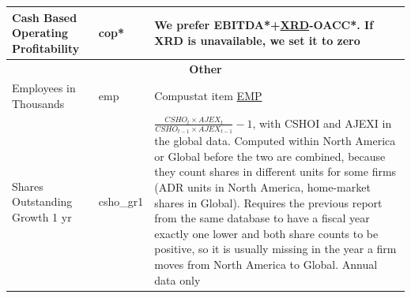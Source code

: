 \documentclass[12pt,title,fleqn]{article}
\begin{document}
{\begin{longtable}{@{\extracolsep{\fill}}|m{5cm}|l|m{8cm}|@{}}
	Cash Based Operating Profitability & cop\mbox{*} & We prefer EBITDA\mbox{*}+\href{https://wrds-www.wharton.upenn.edu/data-dictionary/form_metadata/comp_na_daily_all_funda_incomestatementitems/XRD/}{XRD}-OACC\mbox{*}. If XRD is unavailable, we set it to zero \\
	
	\hline 
	\multicolumn{3}{|c|}{\textbf{Other}} \\
	\hline 

    Employees in Thousands & emp & Compustat item \href{https://wrds-www.wharton.upenn.edu/data-dictionary/form_metadata/comp_na_daily_all_funda_miscellaneousitems/EMP/}{EMP} \\

    Shares Outstanding Growth 1 yr & csho\_gr1 & $\frac{CSHO_t \times AJEX_t}{CSHO_{t-1} \times AJEX_{t-1}} - 1$, with CSHOI and AJEXI in the global data. Computed within North America or Global before the two are combined, because they count shares in different units for some firms (ADR units in North America, home-market shares in Global). Requires the previous report from the same database to have a fiscal year exactly one lower and both share counts to be positive, so it is usually missing in the year a firm moves from North America to Global. Annual data only \\
\end{longtable}
}
\end{document}
